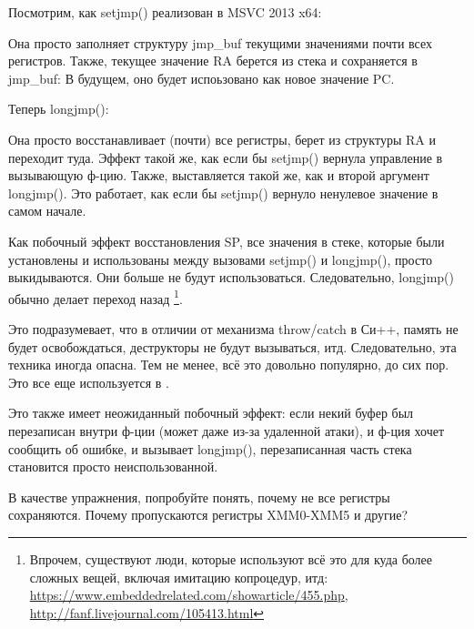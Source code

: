 Посмотрим, как setjmp() реализован в MSVC 2013 x64:



Она просто заполняет структуру jmp\_buf текущими значениями почти всех регистров.
Также, текущее значение \ac{RA} берется из стека и сохраняется в jmp\_buf:
В будущем, оно будет испоьзовано как новое значение \ac{PC}.

Теперь longjmp():



Она просто восстанавливает (почти) все регистры, берет из структуры \ac{RA} и переходит туда.
Эффект такой же, как если бы setjmp() вернула управление в вызывающую ф-цию.
Также,  выставляется такой же, как и второй аргумент longjmp().
Это работает, как если бы setjmp() вернуло ненулевое значение в самом начале.

Как побочный эффект восстановления \ac{SP}, все значения в стеке, которые были установлены и использованы между
вызовами setjmp() и longjmp(), просто выкидываются.
Они больше не будут использоваться.
Следовательно, longjmp() обычно делает переход назад
\footnote{Впрочем, существуют люди, которые используют всё это для куда более сложных вещей, включая имитацию копроцедур, итд:
\url{https://www.embeddedrelated.com/showarticle/455.php},
\url{http://fanf.livejournal.com/105413.html}}.

Это подразумевает, что в отличии от механизма throw/catch в Си++, память не будет освобождаться,
деструкторы не будут вызываться, итд.
Следовательно, эта техника иногда опасна.
Тем не менее, всё это довольно популярно, до сих пор. Это все еще используется в \oracle.

Это также имеет неожиданный побочный эффект: если некий буфер был перезаписан внутри ф-ции (может даже из-за удаленной атаки),
и ф-ция хочет сообщить об ошибке, и вызывает longjmp(), перезаписанная часть стека становится просто неиспользованной.

В качестве упражнения, попробуйте понять, почему не все регистры сохраняются.
Почему пропускаются регистры XMM0-XMM5 и другие?

